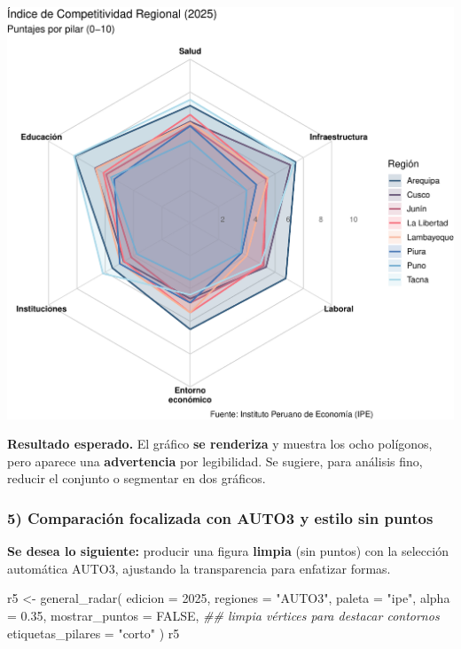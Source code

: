 \documentclass[
  11pt,
  letterpaper,
  DIV=11,
  numbers=noendperiod]{scrartcl}
\newenvironment{Shaded}{\begin{snugshade}}{\end{snugshade}}
\newcommand{\AttributeTok}[1]{\textcolor[rgb]{0.40,0.45,0.13}{#1}}
\newcommand{\ConstantTok}[1]{\textcolor[rgb]{0.56,0.35,0.01}{#1}}
\newcommand{\DecValTok}[1]{\textcolor[rgb]{0.68,0.00,0.00}{#1}}
\newcommand{\DocumentationTok}[1]{\textcolor[rgb]{0.37,0.37,0.37}{\textit{#1}}}
\newcommand{\FloatTok}[1]{\textcolor[rgb]{0.68,0.00,0.00}{#1}}
\newcommand{\FunctionTok}[1]{\textcolor[rgb]{0.28,0.35,0.67}{#1}}
\newcommand{\NormalTok}[1]{\textcolor[rgb]{0.00,0.23,0.31}{#1}}
\newcommand{\OtherTok}[1]{\textcolor[rgb]{0.00,0.23,0.31}{#1}}
\newcommand{\StringTok}[1]{\textcolor[rgb]{0.13,0.47,0.30}{#1}}
\begin{document}
\includegraphics{Manual_files/figure-pdf/unnamed-chunk-55-1.pdf}

\textbf{Resultado esperado.} El gráfico \textbf{se renderiza} y muestra
los ocho polígonos, pero aparece una \textbf{advertencia} por
legibilidad. Se sugiere, para análisis fino, reducir el conjunto o
segmentar en dos gráficos.

\subsubsection{\texorpdfstring{\textbf{5) Comparación focalizada con
AUTO3 y estilo sin
puntos}}{5) Comparación focalizada con AUTO3 y estilo sin puntos}}\label{comparaciuxf3n-focalizada-con-auto3-y-estilo-sin-puntos}

\textbf{Se desea lo siguiente:} producir una figura \textbf{limpia} (sin
puntos) con la selección automática AUTO3, ajustando la transparencia
para enfatizar formas.

\begin{Shaded}
\begin{Highlighting}[]
\NormalTok{r5 }\OtherTok{\textless{}{-}} \FunctionTok{general\_radar}\NormalTok{(}
  \AttributeTok{edicion  =} \DecValTok{2025}\NormalTok{,}
  \AttributeTok{regiones =} \StringTok{"AUTO3"}\NormalTok{,}
  \AttributeTok{paleta   =} \StringTok{"ipe"}\NormalTok{,}
  \AttributeTok{alpha    =} \FloatTok{0.35}\NormalTok{,}
  \AttributeTok{mostrar\_puntos    =} \ConstantTok{FALSE}\NormalTok{,   }\DocumentationTok{\#\# limpia vértices para destacar contornos}
  \AttributeTok{etiquetas\_pilares =} \StringTok{"corto"}
\NormalTok{)}
\NormalTok{r5}
\end{Highlighting}
\end{Shaded}
\end{document}
